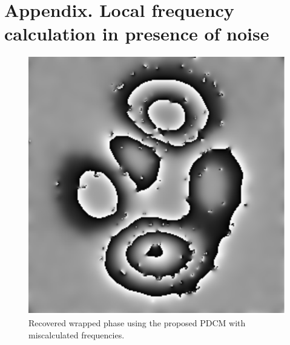 \section{Appendix. Local frequency calculation in presence of noise}

\begin{figure}[Ht!] \label{fig:FaseErrorFrecuencias}
  \begin{center}
      \includegraphics[scale=0.6]{Chpt4_figures/fig_mFaseErrorFrecuencias.eps}
  \end{center}
  \caption{Recovered wrapped phase using the proposed PDCM with 
  miscalculated frequencies.}
\end{figure}

